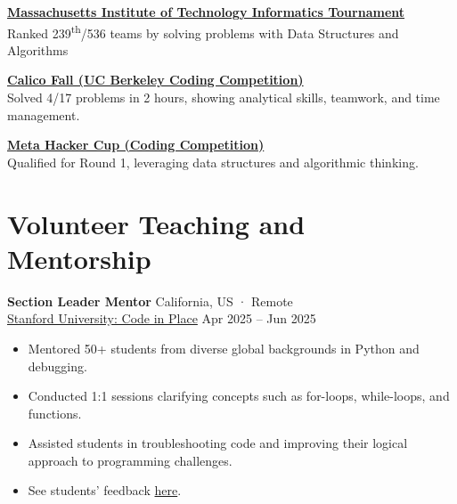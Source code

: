 \documentclass[a4paper,12pt]{article}
\begin{document}
\vspace{0.5em}


\textbf{\href{https://www.linkedin.com/posts/muhammad-qasim-gill_mit2winter2025-teamicodegurupro-problemsolving-activity-7287252831252680704-BMRf?utm_source=share&utm_medium=member_desktop&rcm=ACoAACG6gOwBnlfoWP0KSUXYMZV0hE4WXwmWsBQ}{Massachusetts Institute of Technology Informatics Tournament}} \\
Ranked 239\textsuperscript{th}/536 teams by solving problems with Data Structures and Algorithms


\vspace{0.5em}

\textbf{\href{https://drive.google.com/file/d/1m7mCVE9o4MydZOjpE6-6a_idNBluioeA/view?usp=drive_link}{Calico Fall (UC Berkeley Coding Competition)}} \\
Solved 4/17 problems in 2 hours, showing analytical skills, teamwork, and time management.

\vspace{0.5em}

\textbf{\href{https://drive.google.com/file/d/1HeAbr-IcT9DLcyxMDckvL4oIVeadHqbU/view}{Meta Hacker Cup (Coding Competition)}} \\
Qualified for Round 1, leveraging data structures and algorithmic thinking.



\section{Volunteer Teaching and Mentorship}

\textbf{Section Leader Mentor} \hfill California, US · Remote \\
\href{https://codeinplace.stanford.edu/}{Stanford University: Code in Place} \hfill Apr 2025 -- Jun 2025
\begin{itemize}[leftmargin=*]
    \item Mentored 50+ students from diverse global backgrounds in Python and debugging.
    \item Conducted 1:1 sessions clarifying concepts such as for-loops, while-loops, and functions.
    \item Assisted students in troubleshooting code and improving their logical approach to programming challenges.
    \item See students’ feedback \href{https://media.licdn.com/dms/image/v2/D4D2DAQH_89FutFda4w/profile-treasury-image-shrink_8192_8192/B4DZfE6yljGUAg-/0/1751355439025?e=1756393200&v=beta&t=n1DErPPd6YfASzT0V4SyNly1bj7Gohi6x4FmvWfIecI}{here}.
\end{itemize}
\end{document}
